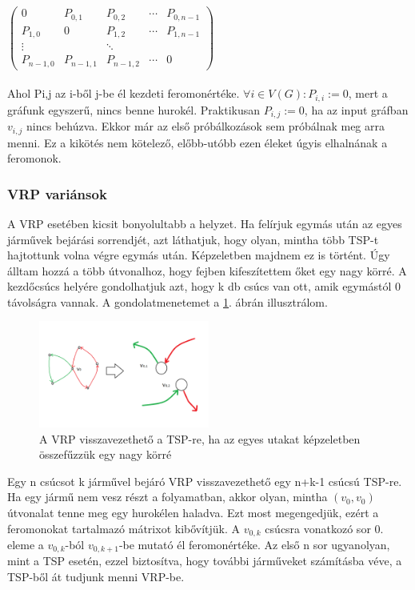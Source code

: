 $\begin{pmatrix}
	0 & P_{0,1} & P_{0,2} & \cdots & P_{0,n-1}\\ 
	P_{1,0} & 0 & P_{1,2} & \cdots & P_{1,n-1} \\
	\vdots & & \ddots \\
	P_{n-1,0} & P_{n-1,1} & P_{n-1,2} & \cdots & 0
\end{pmatrix}$

\paragraph{}

Ahol P{\scriptsize i,j} az i-ből j-be él kezdeti feromonértéke. \( \forall i\in V(G) : P_{i,i}:=0 \), mert a gráfunk egyszerű, nincs benne hurokél. Praktikusan \( P_{i,j}:=0 \), ha az input gráfban \(v_{i,j}\) nincs behúzva. Ekkor már az első próbálkozások sem próbálnak meg arra menni. Ez a kikötés nem kötelező, előbb-utóbb ezen éleket úgyis elhalnának a feromonok. 

\subsubsection{VRP variánsok} \label{VRPvariants_subsection}
A VRP esetében kicsit bonyolultabb a helyzet. Ha felírjuk egymás után az egyes járművek bejárási sorrendjét, azt láthatjuk, hogy olyan, mintha több TSP-t hajtottunk volna végre egymás után. Képzeletben majdnem ez is történt. Úgy álltam hozzá a több útvonalhoz, hogy fejben kifeszítettem őket egy nagy körré. A kezdőcsúcs helyére gondolhatjuk azt, hogy k db csúcs van ott, amik egymástól 0 távolságra vannak. A gondolatmenetemet a \ref{tsp-to-vrp}. ábrán illusztrálom. 

\begin{figure}[ht!]
	\centering
	\includegraphics[width=0.5\textwidth]{figures/tsp-to-vrp.png}
	\caption{A VRP visszavezethető a TSP-re, ha az egyes utakat képzeletben összefűzzük egy nagy körré \label{tsp-to-vrp} }
\end{figure}

Egy n csúcsot k járművel bejáró VRP visszavezethető egy n+k-1 csúcsú TSP-re. Ha egy jármű nem vesz részt a folyamatban, akkor olyan, mintha \( (v_0,v_0) \) útvonalat tenne meg egy hurokélen haladva. Ezt most megengedjük, ezért a feromonokat tartalmazó mátrixot kibővítjük. A \(v_{0,k} \) csúcsra vonatkozó sor 0. eleme a \( v_{0,k}\)-ból \(v_{0,k+1}\)-be mutató él feromonértéke. Az első n sor ugyanolyan, mint a TSP esetén, ezzel biztosítva, hogy további járműveket számításba véve, a TSP-ből át tudjunk menni VRP-be.

